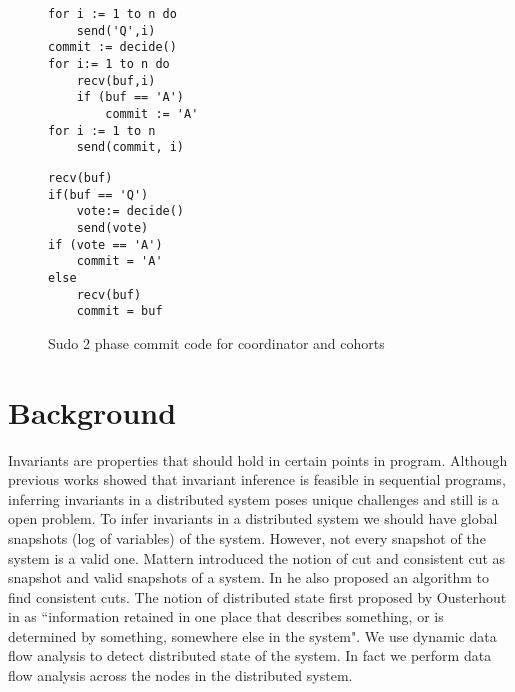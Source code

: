 \begin{figure}
\begin{lstlisting}[caption={Coordinator Code}]
for i := 1 to n do
	send('Q',i)
commit := decide()
for i:= 1 to n do
	recv(buf,i)
	if (buf == 'A')
		commit := 'A'
for i := 1 to n
	send(commit, i)
\end{lstlisting}
\begin{lstlisting}[caption={Coordinator Code}]
recv(buf)
if(buf == 'Q')
	vote:= decide()
	send(vote)
if (vote == 'A')
	commit = 'A'
else
	recv(buf)
	commit = buf
\end{lstlisting}
\caption{Sudo 2 phase commit code for coordinator and cohorts}
\label{lst:2pc}
\end{figure}

\section{Background}

Invariants are properties that should hold in  certain points in program. Although previous works \cite{ernst2001dynamically} showed that invariant inference is feasible in sequential programs, inferring invariants in a distributed system poses unique challenges and still is a open problem. To infer invariants in a distributed system we should have global snapshots (log of variables) of the system. However, not every snapshot of the system is a valid one. Mattern introduced the notion of cut and consistent cut as snapshot and valid snapshots of a system. In \cite{mattern1989virtual} he also proposed an algorithm to find consistent cuts. The notion of distributed state first proposed by Ousterhout in \cite{ousterhout1991role} as ``information retained in one place that describes something, or is determined by something, somewhere else in the system". We use dynamic data flow analysis to detect distributed state of the system. In fact we perform data flow analysis across the nodes in the distributed system.


